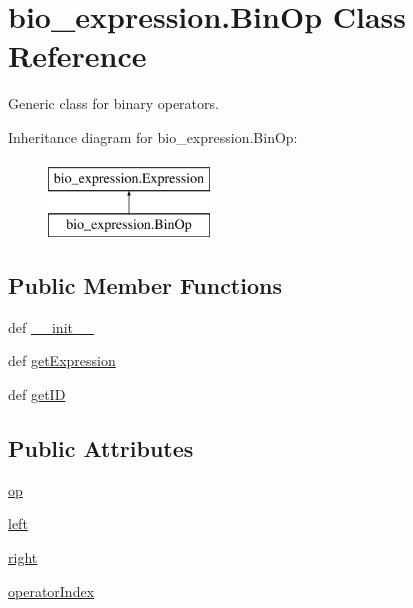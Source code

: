 \hypertarget{classbio__expression_1_1_bin_op}{\section{bio\+\_\+expression.\+Bin\+Op Class Reference}
\label{classbio__expression_1_1_bin_op}
}


Generic class for binary operators.  


Inheritance diagram for bio\+\_\+expression.\+Bin\+Op\+:\begin{figure}[H]
\begin{center}
\leavevmode
\includegraphics[height=2.000000cm]{d0/d3e/classbio__expression_1_1_bin_op}
\end{center}
\end{figure}
\subsection*{Public Member Functions}
\begin{DoxyCompactItemize}
\item 
def \hyperlink{classbio__expression_1_1_bin_op_a3b23ba7e4ba99cf2469728125d5dd66c}{\+\_\+\+\_\+init\+\_\+\+\_\+}
\item 
def \hyperlink{classbio__expression_1_1_bin_op_abb0aceceaf881fafa9d2ee2cb9cbcb92}{get\+Expression}
\item 
def \hyperlink{classbio__expression_1_1_bin_op_ab5a7256b62c918fdb45f925e2af03bd2}{get\+I\+D}
\end{DoxyCompactItemize}
\subsection*{Public Attributes}
\begin{DoxyCompactItemize}
\item 
\hyperlink{classbio__expression_1_1_bin_op_a3839086f0be1bb27fe19fd22ab9bfadc}{op}
\item 
\hyperlink{classbio__expression_1_1_bin_op_ac423b3a4a34de6ac276487e87863daf5}{left}
\item 
\hyperlink{classbio__expression_1_1_bin_op_aa301b38f79504a875746a683dfe02811}{right}
\item 
\hyperlink{classbio__expression_1_1_bin_op_aabcd96f55bc50e5e3f09406de8a42c65}{operator\+Index}
\end{DoxyCompactItemize}



